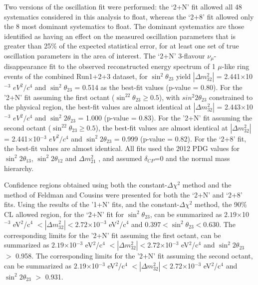 Two versions of the oscillation fit were performed: the `2+N' fit allowed all 48 systematics considered 
in this analysis to float, whereas the `2+8' fit allowed only the 8 most dominant systematics to float. 
The dominant systematics are those identified as having an effect on the measured oscillation parameters 
that is greater than 25\% of the expected statistical error, for at least one set of true oscillation 
parameters in the area of interest. The `2+N' 3-flavour $\nu_{\mu}$-disappearance fit to
the observed reconstructed energy spectrum of 1 $\mu$-like ring events of the combined Run1+2+3 dataset,
for $\sin^2\theta_{23}$ yield
$|\Delta m^{2}_{32}|$ = 2.441$\times$10$^{-3}$ $eV^{2}/c^{4}$  and
$\sin^{2}\theta_{23}$ = 0.514
as the best-fit values (p-value = 0.80).
For the '2+N' fit assuming the first octant ($\sin^22\theta_{23} \geq 0.5$),
with $sin^{2}2\theta_{23}$ constrained to the physical region,
the best-fit values are almost identical at
$|\Delta m^{2}_{32}|$ = 2.443$\times$10$^{-3}$ $eV^{2}/c^{4}$  and
$\sin^{2}2\theta_{23}$ = 1.000
(p-value = 0.83).
For the '2+N' fit assuming the second octant ($\sin^22\theta_{23} \geq 0.5$),
the best-fit values are almost identical at
$|\Delta m^{2}_{32}|$ = 2.441$\times$10$^{-3}$ $eV^{2}/c^{4}$  and
$\sin^{2}2\theta_{23}$ = 0.999
(p-value = 0.82).
For the `2+8' fit, the best-fit values are almost identical.
All fits used the 2012 PDG values for
$\sin^{2}2\theta_{13}$, $\sin^{2}2\theta_{12}$ and $\Delta m^{2}_{21}$ \cite{PDG2012},
and assumed $\delta_{CP}$=0 and the normal mass hierarchy.

Confidence regions obtained using both the constant-$\Delta\chi^2$ method and the 
method of Feldman and Cousins were presented for both the `2+N' and `2+8' fits.
Using the results of the '1+N' fits, 
and the constant-$\Delta\chi^2$ method,
the 90\% CL allowed region, for the `2+N' fit for $\sin^2\theta_{23}$, can be summarized as
$2.19$$\times$10$^{-3}$ eV$^{2}$/c$^{4}$ $< |\Delta m^2_{32}| < 2.72$$\times$10$^{-3}$ eV$^{2}$/c$^{4}$ and
$0.397 < \sin^{2}\theta_{23} < 0.630$.
The corresponding limits for the '2+N' fit assuming the first octant, can be summarized as
$2.19$$\times$10$^{-3}$ eV$^{2}$/c$^{4}$ $< |\Delta m^2_{32}| < 2.72$$\times$10$^{-3}$ eV$^{2}$/c$^{4}$ and
$\sin^{2}2\theta_{23}$ $>$ 0.958.
The corresponding limits for the '2+N' fit assuming the second octant, can be summarized as
$2.19$$\times$10$^{-3}$ eV$^{2}$/c$^{4}$ $< |\Delta m^2_{32}| < 2.72$$\times$10$^{-3}$ eV$^{2}$/c$^{4}$ and
$\sin^{2}2\theta_{23}$ $>$ 0.931.

